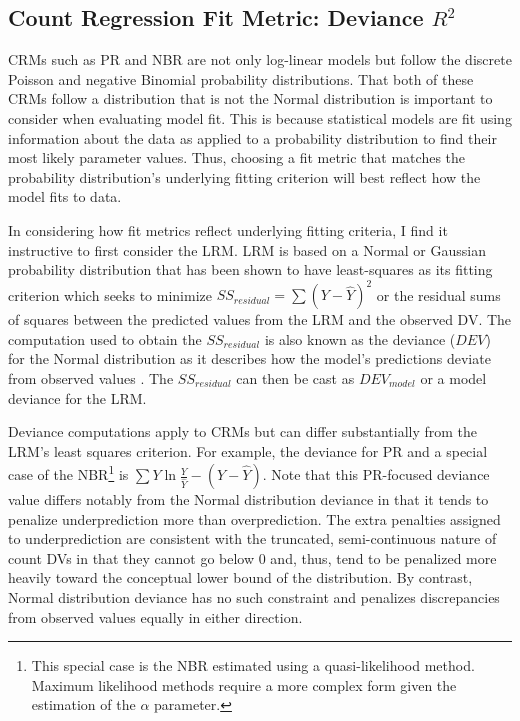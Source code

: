 \documentclass[doc]{apa7}
\begin{document}
	\subsection{Count Regression Fit Metric: Deviance $R^2$}
	
	CRMs such as PR and NBR are not only log-linear models but follow the discrete Poisson and negative Binomial probability distributions.
	That both of these CRMs follow a distribution that is not the Normal distribution is important to consider when evaluating model fit.
	This is because statistical models are fit using information about the data as applied to a probability distribution to find their most likely parameter values.
	Thus, choosing a fit metric that matches the probability distribution's underlying fitting criterion will best reflect how the model fits to data.
	
	In considering how fit metrics reflect underlying fitting criteria, I find it instructive to first consider the LRM.
	LRM is based on a Normal or Gaussian probability distribution that has been shown to have least-squares as its fitting criterion which seeks to minimize $SS_{residual} = \sum (Y - \hat{Y})^2$ or the residual sums of squares between the predicted values from the LRM and the observed DV. The computation used to obtain the $SS_{residual}$ is also known as the deviance ($DEV$) for the Normal distribution as it describes how the model's predictions deviate from observed values \parencite{mccullagh2019generalized}.
	The $SS_{residual}$ can then be cast as $DEV_{model}$ or a model deviance for the LRM.
	
	Deviance computations apply to CRMs but can differ substantially from the LRM's least squares criterion.
	For example, the deviance for PR and a special case of the NBR\footnote{
		This special case is the NBR estimated using a quasi-likelihood method. 
		Maximum likelihood methods require a more complex form given the estimation of the $\alpha$ parameter.} 
	is $\sum Y\ln \frac{Y}{\hat{Y}} - (Y - \hat{Y})$. 
	Note that this PR-focused deviance value differs notably from the Normal distribution deviance in that it tends to penalize underprediction more than overprediction.
	The extra penalties assigned to underprediction are consistent with the truncated, semi-continuous nature of count DVs in that they cannot go below 0 and, thus, tend to be penalized more heavily toward the conceptual lower bound of the distribution.
	By contrast, Normal distribution deviance has no such constraint and penalizes discrepancies from observed values equally in either direction.
	
\end{document}

